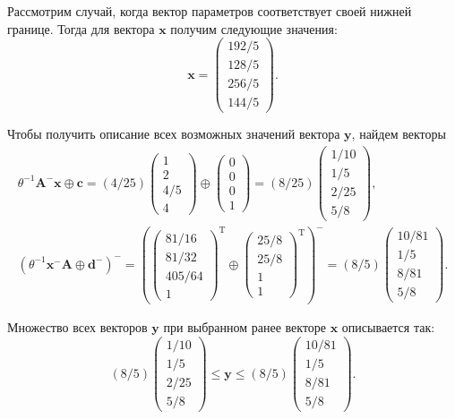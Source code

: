 \documentclass[specialist,
               substylefile = spbu.rtx,
               subf,href,colorlinks=true, 12pt]{disser}
\DeclareMathOperator{\T}{T}
\theoremstyle{definition}
\begin{document}
Рассмотрим случай, когда вектор параметров соответствует своей нижней границе.
Тогда для вектора $\bm{x}$ получим следующие значения:
\begin{equation*}
\bm{x}
=
\begin{pmatrix}
192/5\\128/5\\256/5\\144/5
\end{pmatrix}.
\end{equation*}

Чтобы получить описание всех возможных значений вектора $\bm{y}$, найдем векторы
\begin{gather*}
\theta^{-1}\bm{A}^{-}\bm{x}
\oplus
\bm{c}
=
(4/25)
\begin{pmatrix}
1\\2\\4/5\\4
\end{pmatrix}
\oplus
\begin{pmatrix}
0\\0\\0\\1
\end{pmatrix}
=(8/25)
\begin{pmatrix}
1/10\\1/5\\2/25\\5/8
\end{pmatrix},
\\
(\theta^{-1}\bm{x}^{-}\bm{A}\oplus\bm{d}^{-})^{-}
=
\left(
\begin{pmatrix}
81/16\\81/32\\405/64\\1
\end{pmatrix}^{\T}
\oplus
\begin{pmatrix}
25/8\\25/8\\1\\1
\end{pmatrix}^{\T}
\right)^{-}
=
(8/5)
\begin{pmatrix}
10/81\\1/5\\8/81\\5/8
\end{pmatrix}.
\end{gather*}

Множество всех векторов $\bm{y}$ при выбранном ранее векторе $\bm{x}$ описывается так:
\begin{equation*}
(8/5)
\begin{pmatrix}
1/10\\1/5\\2/25\\5/8
\end{pmatrix}
\leq
\bm{y}
\leq
(8/5)
\begin{pmatrix}
10/81\\1/5\\8/81\\5/8
\end{pmatrix}.
\end{equation*}
\end{document}
